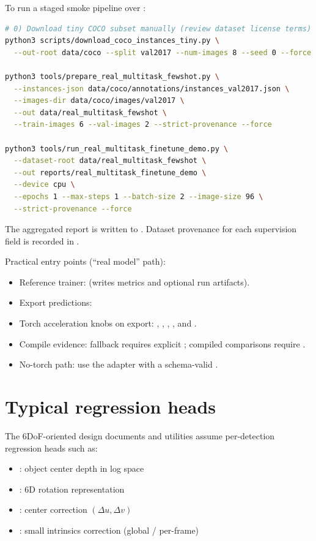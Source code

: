 To run a staged smoke pipeline over :
\begin{lstlisting}[language=bash]
# 0) Download tiny COCO subset manually (review dataset license terms)
python3 scripts/download_coco_instances_tiny.py \
  --out-root data/coco --split val2017 --num-images 8 --seed 0 --force

python3 tools/prepare_real_multitask_fewshot.py \
  --instances-json data/coco/annotations/instances_val2017.json \
  --images-dir data/coco/images/val2017 \
  --out data/real_multitask_fewshot \
  --train-images 6 --val-images 2 --strict-provenance --force

python3 tools/run_real_multitask_finetune_demo.py \
  --dataset-root data/real_multitask_fewshot \
  --out reports/real_multitask_finetune_demo \
  --device cpu \
  --epochs 1 --max-steps 1 --batch-size 2 --image-size 96 \
  --strict-provenance --force
\end{lstlisting}
The aggregated report is written to .
Dataset provenance for each supervision field is recorded in .

Practical entry points (``real model'' path):
\begin{itemize}
  \item Reference trainer:  (writes metrics and optional run artifacts).
  \item Export predictions: 
  \item Torch acceleration knobs on export: , , , , and .
  \item Compile evidence: fallback requires explicit ; compiled comparisons require .
  \item No-torch path: use the  adapter with a schema-valid .
\end{itemize}

\section{Typical regression heads}
The 6DoF-oriented design documents and utilities assume per-detection regression heads such as:
\begin{itemize}
  \item \cmd{log_z}: object center depth in log space
  \item \cmd{rot6d}: 6D rotation representation \cite{zhou2019rot6d}
  \item \cmd{offsets}: center correction $(\Delta u,\Delta v)$
  \item \cmd{k_delta}: small intrinsics correction (global / per-frame)
\end{itemize}

